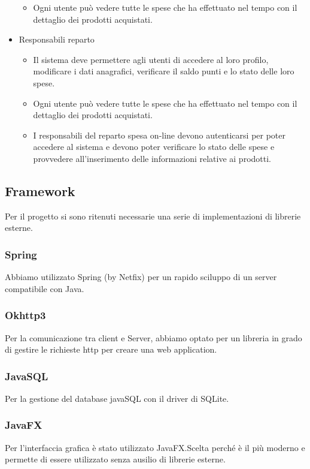 \documentclass[12pt, a4paper]{report}
\begin{document}
\begin{itemize}
\begin{itemize}
      \item Ogni utente può vedere tutte le spese che ha effettuato nel tempo 
        con il dettaglio dei prodotti acquistati.
    \end{itemize}
  \item Responsabili reparto
    \begin{itemize}
      \item  Il  sistema  deve  permettere  agli  utenti  di  accedere  al  loro
        profilo,  modificare  i  dati  anagrafici, verificare il saldo punti e 
        lo stato delle loro spese.
      \item Ogni utente può vedere tutte le spese che ha effettuato nel tempo 
        con il dettaglio dei prodotti acquistati.
      \item I responsabili del reparto spesa on-line devono autenticarsi per 
        poter accedere al sistema e devono poter  verificare  lo  stato delle  
        spese  e  provvedere  all’inserimento delle  informazioni  relative  ai
        prodotti.
    \end{itemize}
\end{itemize}

\subsection{Framework}
Per il progetto si sono ritenuti necessarie una serie di implementazioni di librerie esterne.
\subsubsection{Spring}
Abbiamo utilizzato Spring (by Netfix) per un rapido sciluppo di un server compatibile con Java.
\subsubsection{Okhttp3}
Per la comunicazione tra client e Server, abbiamo optato per un libreria in grado di gestire le richieste http per creare una web application.
\subsubsection{JavaSQL}
Per la gestione del database javaSQL con il driver di SQLite.
\subsubsection{JavaFX}
Per l'interfaccia grafica è stato utilizzato JavaFX.\@ Scelta perché è il più moderno e permette di essere utilizzato senza ausilio di librerie esterne.
\end{document}
